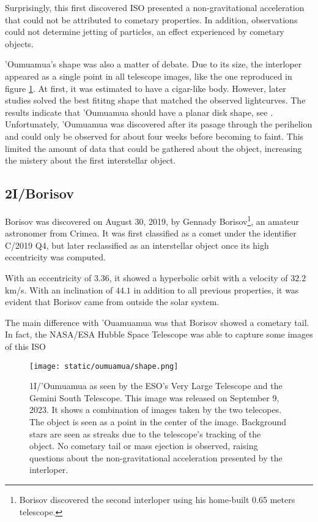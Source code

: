 Surprisingly, this first discovered ISO presented a non-gravitational
acceleration that could not be attributed to cometary properties. In addition,
observations could not determine jetting of particles, an effect experienced by
cometary objects.

'Oumuamua's shape was also a matter of debate. Due to its size, the interloper
appeared as a single point in all telescope images, like the one reproduced in
figure \ref{fig:oumuamua_shape}. At first, it was estimated to have a cigar-like
body. However, later studies solved the best fititng shape that matched the
observed lightcurves. The results indicate that 'Oumuamua should have a planar
disk shape, see \cite{seligman2022}. Unfortunately, 'Oumuamua was discovered
after its pasage through the perihelion and could only be observed for about
four weeks before becoming to faint. This limited the amount of data that could
be gathered about the object, increasing the mistery about the first
interstellar object.


\subsection{2I/Borisov}

Borisov was discovered on August 30, 2019, by Gennady Borisov\footnote{Borisov
discovered the second interloper using his home-built 0.65 meters
telescope.}, an amateur astronomer from Crimea. It was first classified as
a comet under the identifier C/2019 Q4, but later reclassified as an
interstellar object once its high eccentricity was computed.

With an eccentricity of $3.36$, it showed a hyperbolic orbit with a velocity of
$32.2$ km/s. With an inclination of $44.1$ in addition to all previous
properties, it was evident that Borisov came from outside the solar system.

The main difference with 'Ouamuamua was that Borisov showed a cometary tail. In
fact, the NASA/ESA Hubble Space Telescope was able to capture some images of
this ISO


\newpage

\begin{figure}[H]
  \centering
  \texttt{[image: static/oumuamua/shape.png]}
\caption['Oumuamua as seen by the ESO's Very Large Telescope and the Gemini South Telescope]{
  1I/'Oumuamua as seen by the ESO's Very Large Telescope and the Gemini South Telescope. This image was
  released on September 9, 2023. It shows a combination of images taken by the two
  telecopes. The object is seen as a point in the center of the image. Background
  stars are seen as streaks due to the telescope's tracking of the object. No
  cometary tail or mass ejection is observed, raising questions about the non-gravitational
  acceleration presented by the interloper.
  }
  \label{fig:oumuamua_shape}
\end{figure}

